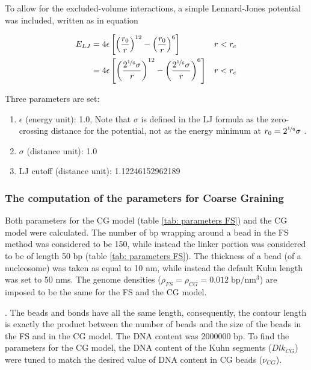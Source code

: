 To allow for the excluded-volume interactions, a simple Lennard-Jones potential was included, written as in equation

\begin{align}
    E_{LJ} &= 4 \epsilon \left[\left(\frac{r_0}{r}\right)^{12} - \left(\frac{r_0}{r}\right)^6\right]&& r < r_c \nonumber\\
           &= 4 \epsilon \left[\left(\frac{2^{\nicefrac{1}{6}}\sigma}{r}\right)^{12} - \left(\frac{2^{\nicefrac{1}{6}}\sigma}{r}\right)^6\right]&& r < r_c 
\end{align}


Three parameters are set:

\begin{enumerate} %
    \item $\epsilon$ (energy unit): 1.0, Note that $\sigma$ is defined in the LJ formula as the zero-crossing distance for the potential, not as the energy minimum at $r_0 = 2^{\nicefrac{1}{6}} \sigma$ .
    \item $\sigma$ (distance unit): 1.0
    \item LJ cutoff (distance unit): 1.12246152962189

\end{enumerate}


\subsubsection{The computation of the parameters for Coarse Graining}
Both parameters for the CG model (table \ref{tab: parameters FS}) and the CG model were calculated. The number of bp wrapping around a bead in the FS method was considered to be 150, while instead the linker portion was considered to be of length 50 bp (table \ref{tab: parameters FS}). The thickness of a bead (of a nucleosome) was taken as equal to 10 nm, while instead the default Kuhn length was set to 50 nms. The genome densities ($\rho_{FS} = \rho_{CG} = 0.012\; \text{bp}/\text{nm}^3$) are imposed to be the same for the FS and the CG model.

.
The beads and bonds have all the same length, consequently, the contour length is exactly the product between the number of beads and the size of the beads in the FS and in the CG model. The DNA content was 2000000 bp. To find the parameters for the CG model, the DNA content of the Kuhn segments ($Dlk_{CG}$) were tuned to match the desired value of DNA content in CG beads ($\nu_{CG}$).


